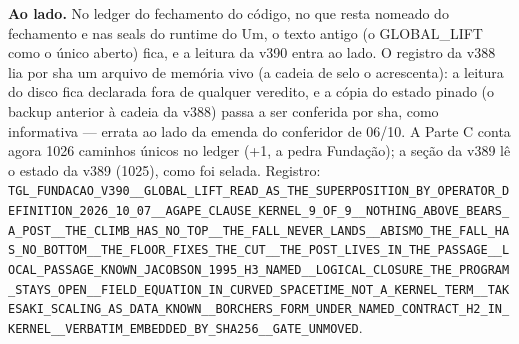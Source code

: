 \documentclass[11pt]{article}
\theoremstyle{definition}\newtheorem{deriv}{Derivação}
\begin{document}
\textbf{Ao lado.} No ledger do fechamento do código, no que resta nomeado do fechamento e nas seals do runtime do Um, o texto antigo (o GLOBAL\_LIFT como o único aberto) fica, e a leitura da v390 entra ao lado. O registro da v388 lia por sha um arquivo de memória vivo (a cadeia de selo o acrescenta): a leitura do disco fica declarada fora de qualquer veredito, e a cópia do estado pinado (o backup anterior à cadeia da v388) passa a ser conferida por sha, como informativa --- errata ao lado da emenda do conferidor de 06/10. A Parte C conta agora 1026 caminhos únicos no ledger (+1, a pedra Fundação); a seção da v389 lê o estado da v389 (1025), como foi selada. Registro: \texttt{TGL\_\allowbreak{}FUNDACAO\_\allowbreak{}V390\_\allowbreak{}\_\allowbreak{}GLOBAL\_\allowbreak{}LIFT\_\allowbreak{}READ\_\allowbreak{}AS\_\allowbreak{}THE\_\allowbreak{}SUPERPOSITION\_\allowbreak{}BY\_\allowbreak{}OPERATOR\_\allowbreak{}DEFINITION\_\allowbreak{}2026\_\allowbreak{}10\_\allowbreak{}07\_\allowbreak{}\_\allowbreak{}AGAPE\_\allowbreak{}CLAUSE\_\allowbreak{}KERNEL\_\allowbreak{}9\_\allowbreak{}OF\_\allowbreak{}9\_\allowbreak{}\_\allowbreak{}NOTHING\_\allowbreak{}ABOVE\_\allowbreak{}BEARS\_\allowbreak{}A\_\allowbreak{}POST\_\allowbreak{}\_\allowbreak{}THE\_\allowbreak{}CLIMB\_\allowbreak{}HAS\_\allowbreak{}NO\_\allowbreak{}TOP\_\allowbreak{}\_\allowbreak{}THE\_\allowbreak{}FALL\_\allowbreak{}NEVER\_\allowbreak{}LANDS\_\allowbreak{}\_\allowbreak{}ABISMO\_\allowbreak{}THE\_\allowbreak{}FALL\_\allowbreak{}HAS\_\allowbreak{}NO\_\allowbreak{}BOTTOM\_\allowbreak{}\_\allowbreak{}THE\_\allowbreak{}FLOOR\_\allowbreak{}FIXES\_\allowbreak{}THE\_\allowbreak{}CUT\_\allowbreak{}\_\allowbreak{}THE\_\allowbreak{}POST\_\allowbreak{}LIVES\_\allowbreak{}IN\_\allowbreak{}THE\_\allowbreak{}PASSAGE\_\allowbreak{}\_\allowbreak{}LOCAL\_\allowbreak{}PASSAGE\_\allowbreak{}KNOWN\_\allowbreak{}JACOBSON\_\allowbreak{}1995\_\allowbreak{}H3\_\allowbreak{}NAMED\_\allowbreak{}\_\allowbreak{}LOGICAL\_\allowbreak{}CLOSURE\_\allowbreak{}THE\_\allowbreak{}PROGRAM\_\allowbreak{}STAYS\_\allowbreak{}OPEN\_\allowbreak{}\_\allowbreak{}FIELD\_\allowbreak{}EQUATION\_\allowbreak{}IN\_\allowbreak{}CURVED\_\allowbreak{}SPACETIME\_\allowbreak{}NOT\_\allowbreak{}A\_\allowbreak{}KERNEL\_\allowbreak{}TERM\_\allowbreak{}\_\allowbreak{}TAKESAKI\_\allowbreak{}SCALING\_\allowbreak{}AS\_\allowbreak{}DATA\_\allowbreak{}KNOWN\_\allowbreak{}\_\allowbreak{}BORCHERS\_\allowbreak{}FORM\_\allowbreak{}UNDER\_\allowbreak{}NAMED\_\allowbreak{}CONTRACT\_\allowbreak{}H2\_\allowbreak{}IN\_\allowbreak{}KERNEL\_\allowbreak{}\_\allowbreak{}VERBATIM\_\allowbreak{}EMBEDDED\_\allowbreak{}BY\_\allowbreak{}SHA256\_\allowbreak{}\_\allowbreak{}GATE\_\allowbreak{}UNMOVED}.
\end{document}

